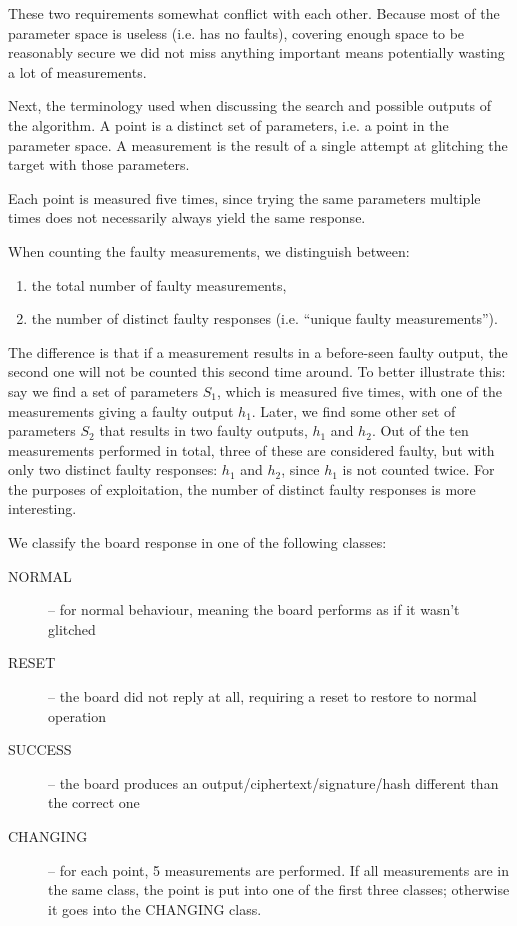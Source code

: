 \documentclass[times, utf8, diplomski]{fer}
\begin{document}
These two requirements somewhat conflict with each other. Because most of the
parameter space is useless (i.e. has no faults), covering enough space to be
reasonably secure we did not miss anything important means potentially wasting
a lot of measurements.

Next, the terminology used when discussing the search and possible outputs of the algorithm.
A point is a distinct set of parameters, i.e. a point in the parameter space.
A measurement is the result of a single attempt at glitching the target with those parameters.

Each point is measured five times, since trying the same parameters multiple
times does not necessarily always yield the same response.

When counting the faulty measurements, we distinguish between:
\begin{enumerate}
    \item the total number of faulty measurements,
    \item the number of distinct faulty responses (i.e. ``unique faulty measurements'').
\end{enumerate}

The difference is that if a measurement results in a before-seen faulty output,
the second one will not be counted this second time around.
To better illustrate this: say we find a set of parameters $S_1$, which is
measured five times, with one of the measurements giving a faulty output $h_1$.
Later, we find some other set of parameters $S_2$ that results in two faulty
outputs, $h_1$ and $h_2$. Out of the ten measurements performed in total, three
of these are considered faulty, but with only two distinct faulty responses:
$h_1$ and $h_2$, since $h_1$ is not counted twice.
For the purposes of exploitation, the number of distinct faulty responses is
more interesting.

We classify the board response in one of the following classes:
\begin{description}
    \item[NORMAL]   -- for normal behaviour, meaning the board performs as if it wasn't glitched
    \item[RESET]    -- the board did not reply at all, requiring a reset to restore to normal operation
    \item[SUCCESS]  -- the board produces an output/ciphertext/signature/hash different than the correct one
    \item[CHANGING] -- for each point, 5 measurements are performed. If all measurements are in the
                       same class, the point is put into one of the first three classes; otherwise
                       it goes into the CHANGING class.
\end{description}
\end{document}
